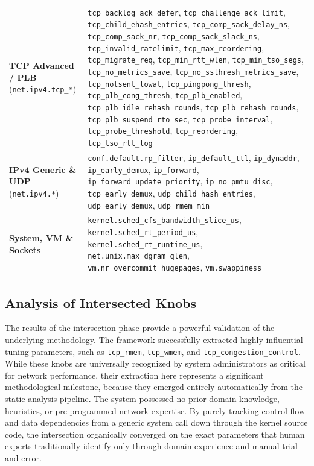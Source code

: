 \begin{table}[htbp]
\begin{tabular}{@{} >{\raggedright\arraybackslash}p{4.5cm} >{\raggedright\arraybackslash}p{10cm} @{}}
        \textbf{TCP Advanced / PLB} \newline (\texttt{net.ipv4.tcp\_*}) & 
        \texttt{tcp\_backlog\_ack\_defer}, \texttt{tcp\_challenge\_ack\_limit}, \texttt{tcp\_child\_ehash\_entries}, \texttt{tcp\_comp\_sack\_delay\_ns}, \texttt{tcp\_comp\_sack\_nr}, \texttt{tcp\_comp\_sack\_slack\_ns}, \texttt{tcp\_invalid\_ratelimit}, \texttt{tcp\_max\_reordering}, \texttt{tcp\_migrate\_req}, \texttt{tcp\_min\_rtt\_wlen}, \texttt{tcp\_min\_tso\_segs}, \texttt{tcp\_no\_metrics\_save}, \texttt{tcp\_no\_ssthresh\_metrics\_save}, \texttt{tcp\_notsent\_lowat}, \texttt{tcp\_pingpong\_thresh}, \texttt{tcp\_plb\_cong\_thresh}, \texttt{tcp\_plb\_enabled}, \texttt{tcp\_plb\_idle\_rehash\_rounds}, \texttt{tcp\_plb\_rehash\_rounds}, \texttt{tcp\_plb\_suspend\_rto\_sec}, \texttt{tcp\_probe\_interval}, \texttt{tcp\_probe\_threshold}, \texttt{tcp\_reordering}, \texttt{tcp\_tso\_rtt\_log} \\
        
        \textbf{IPv4 Generic \& UDP} \newline (\texttt{net.ipv4.*}) & 
        \texttt{conf.default.rp\_filter}, \texttt{ip\_default\_ttl}, \texttt{ip\_dynaddr}, \texttt{ip\_early\_demux}, \texttt{ip\_forward}, \texttt{ip\_forward\_update\_priority}, \texttt{ip\_no\_pmtu\_disc}, \texttt{tcp\_early\_demux}, \texttt{udp\_child\_hash\_entries}, \texttt{udp\_early\_demux}, \texttt{udp\_rmem\_min} \\
        
        \textbf{System, VM \& Sockets} & 
        \texttt{kernel.sched\_cfs\_bandwidth\_slice\_us}, \texttt{kernel.sched\_rt\_period\_us}, \texttt{kernel.sched\_rt\_runtime\_us}, \texttt{net.unix.max\_dgram\_qlen}, \texttt{vm.nr\_overcommit\_hugepages}, \texttt{vm.swappiness} \\
        
        \bottomrule
    \end{tabular}
\end{table}

\subsection{Analysis of Intersected Knobs}

The results of the intersection phase provide a powerful validation of the underlying methodology.
The framework successfully extracted highly influential tuning parameters, such as \texttt{tcp\_rmem}, \texttt{tcp\_wmem}, and \texttt{tcp\_congestion\_control}.
While these knobs are universally recognized by system administrators as critical for network performance, their extraction here represents a significant methodological milestone, because they emerged entirely automatically from the static analysis pipeline.
The system possessed no prior domain knowledge, heuristics, or pre-programmed network expertise.
By purely tracking control flow and data dependencies from a generic system call down through the kernel source code, the intersection organically converged on the exact parameters that human experts traditionally identify only through domain experience and manual trial-and-error.

